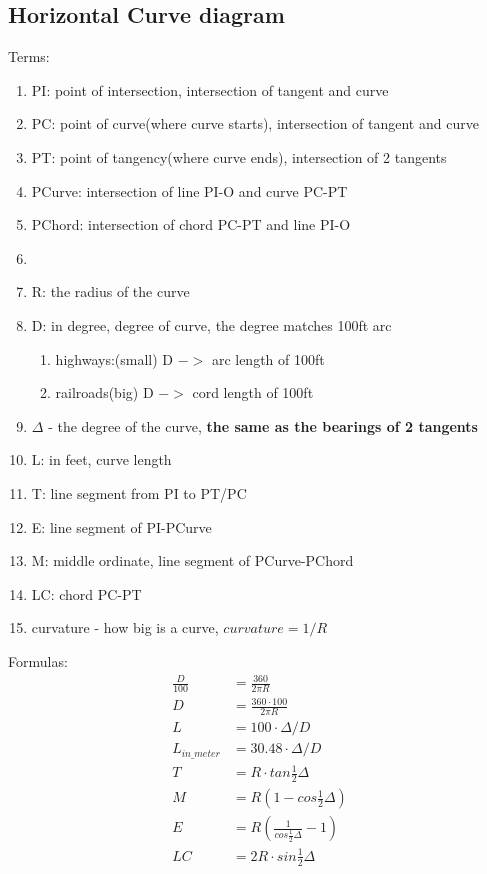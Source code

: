 \documentclass{article}
\begin{document}
  \subsection{Horizontal Curve diagram}
  Terms:
  \begin{enumerate}
    \item PI: point of intersection, intersection of tangent and curve
    \item PC: point of curve(where curve starts), intersection of tangent and curve
    \item PT: point of tangency(where curve ends), intersection of 2 tangents
    \item PCurve: intersection of line PI-O and curve PC-PT
    \item PChord: intersection of chord PC-PT and line PI-O
    \item 
    \item R: the radius of the curve
    \item D: in degree, degree of curve, the degree matches 100ft arc
    \begin{enumerate}
      \item highways:(small) D $->$ arc length of 100ft
      \item railroads(big) D $->$ cord length of 100ft
    \end{enumerate}

    \item $\Delta$ - the degree of the curve, \textbf{the same as the bearings of 2 tangents}
    \item L: in feet, curve length 
    \item T: line segment from PI to PT/PC
    \item E: line segment of PI-PCurve
    \item M: middle ordinate, line segment of PCurve-PChord 
    \item LC: chord PC-PT 
    \item curvature - how big is a curve, $curvature = 1/R$
  \end{enumerate}
  Formulas:
  \begin{align*}
     \frac{D}{100} & = \frac{360}{2\pi R} \\
     D & = \frac{360 \cdot 100}{2\pi R} \\
     L & = 100 \cdot \Delta / D \\
     L_{in\_meter} & = 30.48 \cdot \Delta / D \\
     T & = R \cdot tan \frac{1}{2}\Delta \\
     M & = R(1-cos \frac{1}{2} \Delta) \\
     E & = R(\frac{1}{cos \frac{1}{2} \Delta} - 1) \\
     LC & = 2R \cdot sin \frac{1}{2} \Delta \\
  \end{align*}
\end{document}
